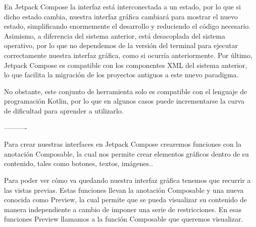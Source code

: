            En Jetpack Compose la interfaz está interconectada a un estado, por lo que si dicho estado cambia, nuestra interfaz gráfica cambiará para mostrar el nuevo estado, simplificando enormemente el desarrollo y reduciendo el código necesario. Asimismo, a diferencia del sistema anterior, está desacoplada del sistema operativo, por lo que no dependemos de la versión del terminal para ejecutar correctamente nuestra interfaz gráfica, como si ocurría anteriormente. Por último, Jetpack Compose es compatible con los componentes XML del sistema anterior, lo que facilita la migración de los proyectos antiguos a este nuevo paradigma.

            No obstante, este conjunto de herramienta solo es compatible con el lenguaje de programación Kotlin, por lo que en algunos casos puede incrementarse la curva de dificultad para aprender a utilizarlo.

            ----------

            Para crear nuestras interfaces en Jetpack Compose crearemos funciones con la anotación Composable, la cual nos permite crear elementos gráficos dentro de su contenido, tales como botones, textos, imágenes..

            Para poder ver cómo va quedando nuestra interfaz gráfica tenemos que recurrir a las vistas previas. Estas funciones llevan la anotación Composable y una nueva conocida como Preview, la cual permite que se pueda visualizar su contenido de manera independiente a cambio de imponer una serie de restricciones. En esas funciones Preview llamamos a la función Composable que queremos visualizar.

            
            
